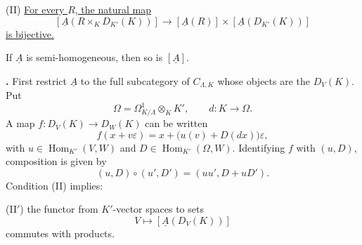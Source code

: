 (II) \underline{For every $R$, the natural map}
\[
 [\underline A(R\times_KD_{K'}(K))]
 \longrightarrow
 [\underline A(R)]\times[\underline A(D_{K'}(K))]
\]
\underline{is bijective.}

If $\underline A$ is semi-homogeneous, then so is $[\underline A]$.

\textbf{.} First restrict $\underline A$ to the full subcategory
of $C_{\Lambda,K}$ whose objects are the $D_V(K)$. Put
\[
 \Omega=\Omega^1_{K/\Lambda}\otimes_KK',
 \qquad d:K\longrightarrow\Omega.
\]
A map $f:D_V(K)\longrightarrow D_W(K)$ can be written
\[
 f(x+v\varepsilon)
 =x+\bigl(u(v)+D(dx)\bigr)\varepsilon,
\]
with $u\in\operatorname{Hom}_{K'}(V,W)$ and
$D\in\operatorname{Hom}_{K'}(\Omega,W)$. Identifying $f$ with
$(u,D)$, composition is given by
\[
 (u,D)\circ(u',D')=(uu',D+uD').
\]
Condition (II) implies:

(II$'$) the functor from $K'$-vector spaces to sets
\[
 V\longmapsto[\underline A(D_V(K))]
\]
commutes with products.

